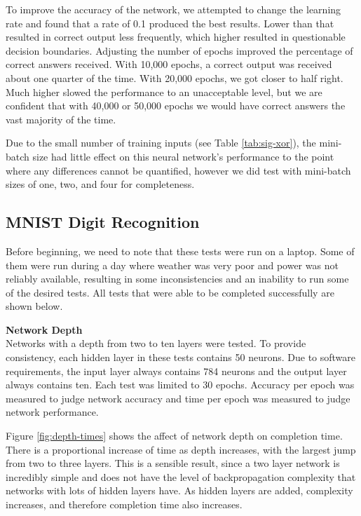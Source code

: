 \documentclass[letter,11pt,titlepage]{article}
\begin{document}
To improve the accuracy of the network, we attempted to change the learning rate and found that a rate of 0.1 produced the best results. Lower than that resulted in correct output less frequently, which higher resulted in questionable decision boundaries. Adjusting the number of epochs improved the percentage of correct answers received. With 10,000 epochs, a correct output was received about one quarter of the time. With 20,000 epochs, we got closer to half right. Much higher slowed the performance to an unacceptable level, but we are confident that with 40,000 or 50,000 epochs we would have correct answers the vast majority of the time.

Due to the small number of training inputs (see Table \ref{tab:sig-xor}), the mini-batch size had little effect on this neural network's performance to the point where any differences cannot be quantified, however we did test with mini-batch sizes of one, two, and four for completeness.

\subsection{MNIST Digit Recognition}

Before beginning, we need to note that these tests were run on a laptop. Some of them were run during a day where weather was very poor and power was not reliably available, resulting in some inconsistencies and an inability to run some of the desired tests. All tests that were able to be completed successfully are shown below.

\textbf{\large{Network Depth}} \\
Networks with a depth from two to ten layers were tested. To provide consistency, each hidden layer in these tests contains 50 neurons. Due to software requirements, the input layer always contains 784 neurons and the output layer always contains ten. Each test was limited to 30 epochs. Accuracy per epoch was measured to judge network accuracy and time per epoch was measured to judge network performance.

Figure \ref{fig:depth-times} shows the affect of network depth on completion time. There is a proportional increase of time as depth increases, with the largest jump from two to three layers. This is a sensible result, since a two layer network is incredibly simple and does not have the level of backpropagation complexity that networks with lots of hidden layers have. As hidden layers are added, complexity increases, and therefore completion time also increases.
\end{document}
